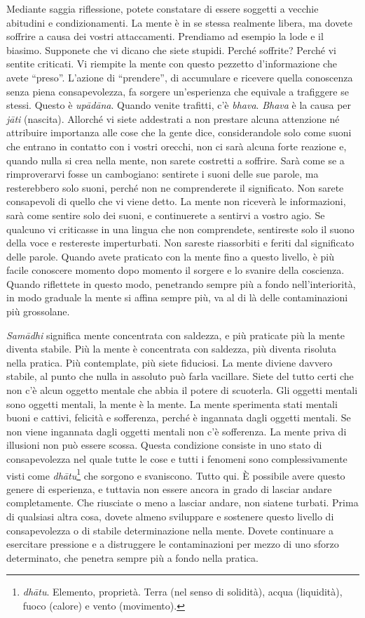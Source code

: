 Mediante saggia riflessione, potete constatare di essere soggetti a
vecchie abitudini e condizionamenti. La mente è in se stessa realmente
libera, ma dovete soffrire a causa dei vostri attaccamenti. Prendiamo ad
esempio la lode e il biasimo. Supponete che vi dicano che siete stupidi.
Perché soffrite? Perché vi sentite criticati. Vi riempite la mente con
questo pezzetto d'informazione che avete ``preso''. L'azione di
``prendere'', di accumulare e ricevere quella conoscenza senza piena
consapevolezza, fa sorgere un'esperienza che equivale a trafiggere se
stessi. Questo è \emph{upādāna}. Quando venite trafitti, c'è
\emph{bhava}. \emph{Bhava} è la causa per \emph{jāti} (nascita).
Allorché vi siete addestrati a non prestare alcuna attenzione né
attribuire importanza alle cose che la gente dice, considerandole solo
come suoni che entrano in contatto con i vostri orecchi, non ci sarà
alcuna forte reazione e, quando nulla si crea nella mente, non sarete
costretti a soffrire. Sarà come se a rimproverarvi fosse un cambogiano:
sentirete i suoni delle sue parole, ma resterebbero solo suoni, perché
non ne comprenderete il significato. Non sarete consapevoli di quello
che vi viene detto. La mente non riceverà le informazioni, sarà come
sentire solo dei suoni, e continuerete a sentirvi a vostro agio. Se
qualcuno vi criticasse in una lingua che non comprendete, sentireste
solo il suono della voce e restereste imperturbati. Non sareste
riassorbiti e feriti dal significato delle parole. Quando avete
praticato con la mente fino a questo livello, è più facile conoscere
momento dopo momento il sorgere e lo svanire della coscienza. Quando
riflettete in questo modo, penetrando sempre più a fondo
nell'interiorità, in modo graduale la mente si affina sempre più, va al
di là delle contaminazioni più grossolane.

\emph{Samādhi} significa mente concentrata con saldezza, e più praticate
più la mente diventa stabile. Più la mente è concentrata con saldezza,
più diventa risoluta nella pratica. Più contemplate, più siete
fiduciosi. La mente diviene davvero stabile, al punto che nulla in
assoluto può farla vacillare. Siete del tutto certi che non c'è alcun
oggetto mentale che abbia il potere di scuoterla. Gli oggetti mentali
sono oggetti mentali, la mente è la mente. La mente sperimenta stati
mentali buoni e cattivi, felicità e sofferenza, perché è ingannata dagli
oggetti mentali. Se non viene ingannata dagli oggetti mentali non c'è
sofferenza. La mente priva di illusioni non può essere scossa. Questa
condizione consiste in uno stato di consapevolezza nel quale tutte le
cose e tutti i fenomeni sono complessivamente visti come
\emph{dhātu}\footnote{\emph{dhātu}. Elemento, proprietà. Terra (nel
  senso di solidità), acqua (liquidità), fuoco (calore) e vento
  (movimento).} che sorgono e svaniscono. Tutto qui. È possibile avere
questo genere di esperienza, e tuttavia non essere ancora in grado di
lasciar andare completamente. Che riusciate o meno a lasciar andare, non
siatene turbati. Prima di qualsiasi altra cosa, dovete almeno sviluppare
e sostenere questo livello di consapevolezza o di stabile determinazione
nella mente. Dovete continuare a esercitare pressione e a distruggere le
contaminazioni per mezzo di uno sforzo determinato, che penetra sempre
più a fondo nella pratica.

